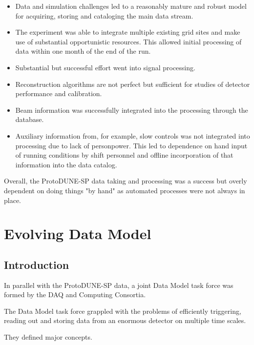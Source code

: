\begin{itemize}
    \item Data and simulation challenges led to a reasonably mature and robust model for acquiring, storing and cataloging the main data stream. 
    \item The experiment was able to integrate multiple existing grid sites and make use of substantial opportunistic resources.  This allowed initial processing of data within one month of the end of the run.
    \item Substantial but successful effort went into signal processing. 
    \item Reconstruction algorithms are not perfect but sufficient for studies of detector performance and calibration. 
    \item Beam information was successfully integrated into the processing through the  database.
    \item Auxiliary information from, for example, slow controls was not integrated into processing due to lack of personpower.  This led to dependence on hand input of running conditions by shift personnel and offline incorporation of that information into the data catalog. 
\end{itemize}

Overall, the ProtoDUNE-SP data taking and processing was a success but overly dependent on doing things "by hand" as automated processes were not always in place. 






\section{Evolving Data Model}		
\label{ch:exec-comp-mod}

\subsection{Introduction}	
\label{ch:exec-comp-mod-int}
In parallel with the ProtoDUNE-SP data, a joint Data Model task force was formed by the DAQ and Computing Consortia. 

The Data Model task force grappled with the problems of efficiently triggering, reading out and storing data from an enormous detector on multiple time scales.

They defined major concepts.

